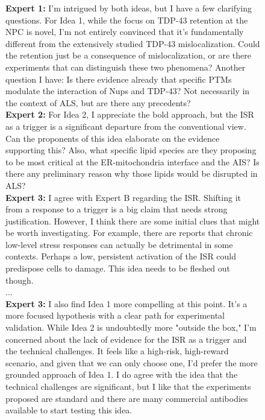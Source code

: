 \begin{figure}[htbp!]
\begin{tcolorbox}[
    colback=black!5!white,
    colframe=black!60!white,
    title=\textbf{Example of a scientific debate match in the Ranking agent tournament},
    fonttitle=\bfseries,
    arc=3mm,
    boxrule=1pt,
    bottomrule=2pt,
]
\footnotesize
\textbf{Expert 1:} I'm intrigued by both ideas, but I have a few clarifying questions. For Idea 1, while the focus on TDP-43 retention at the NPC is novel, I'm not entirely convinced that it's fundamentally different from the extensively studied TDP-43 mislocalization. Could the retention just be a consequence of mislocalization, or are there experiments that can distinguish these two phenomena? Another question I have: Is there evidence already that specific PTMs modulate the interaction of Nups and TDP-43? Not necessarily in the context of ALS, but are there any precedents?\\

\textbf{Expert 2:} For Idea 2, I appreciate the bold approach, but the ISR as a trigger is a significant departure from the conventional view. Can the proponents of this idea elaborate on the evidence supporting this? Also, what specific lipid species are they proposing to be most critical at the ER-mitochondria interface and the AIS? Is there any preliminary reason why those lipids would be disrupted in ALS?\\

\textbf{Expert 3:} I agree with Expert B regarding the ISR. Shifting it from a response to a trigger is a big claim that needs strong justification. However, I think there are some initial clues that might be worth investigating. For example, there are reports that chronic low-level stress responses can actually be detrimental in some contexts. Perhaps a low, persistent activation of the ISR could predispose cells to damage. This idea needs to be fleshed out though.\\

...\\

\textbf{Expert 3:} I also find Idea 1 more compelling at this point. It's a more focused hypothesis with a clear path for experimental validation. While Idea 2 is undoubtedly more "outside the box," I'm concerned about the lack of evidence for the ISR as a trigger and the technical challenges. It feels like a high-risk, high-reward scenario, and given that we can only choose one, I'd prefer the more grounded approach of Idea 1. I do agree with the idea that the technical challenges are significant, but I like that the experiments proposed are standard and there are many commercial antibodies available to start testing this idea.\\


\end{tcolorbox}
\end{figure}
